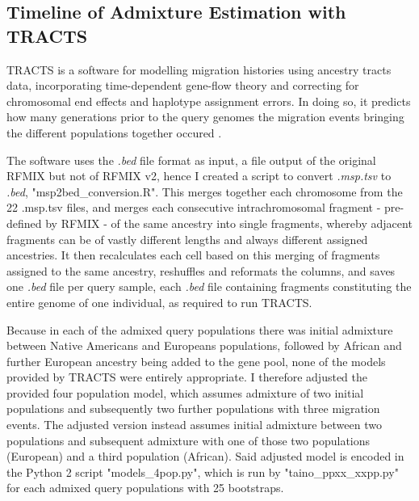 \documentclass[11pt]{article}
\begin{document}
\subsection{Timeline of Admixture Estimation with TRACTS}


TRACTS is a software for modelling migration histories using ancestry tracts data, incorporating time-dependent gene-flow theory and correcting for chromosomal end effects and haplotype assignment errors. In doing so, it predicts how many generations prior to the query genomes the migration events bringing the different populations together occured \parencite{Gravel2012}.

The software uses the \textit{.bed} file format as input, a file output of the original RFMIX but not of RFMIX v2, hence I created a script to convert \textit{.msp.tsv} to \textit{.bed}, "msp2bed\_conversion.R". This merges together each chromosome from the 22 .msp.tsv files, and merges each consecutive intrachromosomal fragment - pre-defined by RFMIX - of the same ancestry into single fragments, whereby adjacent fragments can be of vastly different lengths and always different assigned ancestries. It then recalculates each cell based on this merging of fragments assigned to the same ancestry, reshuffles and reformats the columns, and saves one \textit{.bed} file per query sample, each \textit{.bed} file containing fragments constituting the entire genome of one individual, as required to run TRACTS.

Because in each of the admixed query populations there was initial admixture between Native Americans and Europeans populations, followed by African and further European ancestry being added to the gene pool, none of the models provided by TRACTS were entirely appropriate. I therefore adjusted the provided four population model, which assumes admixture of two initial populations and subsequently two further populations with three migration events. The adjusted version instead assumes initial admixture between two populations and subsequent admixture with one of those two populations (European) and a third population (African). Said adjusted model is encoded in the Python 2 script "models\_4pop.py", which is run by "taino\_ppxx\_xxpp.py" for each admixed query populations with 25 bootstraps.







\vspace{8mm}
\end{document}
